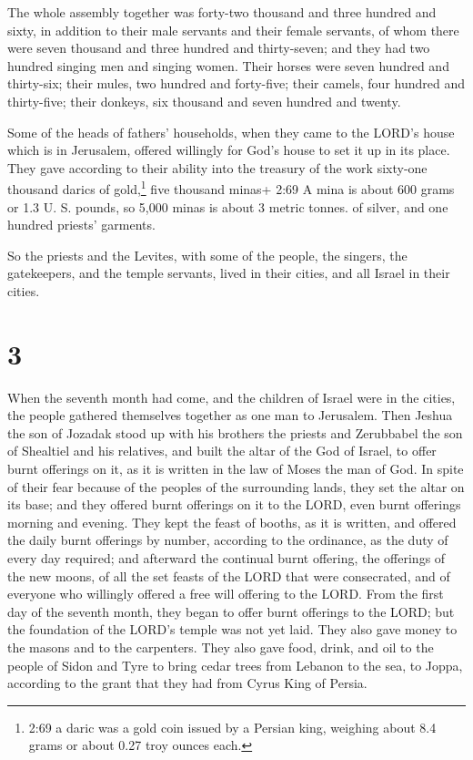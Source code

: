  The whole assembly together was forty-two thousand and
three hundred and sixty,  in addition to their male
servants and their female servants, of whom there were seven thousand
and three hundred and thirty-seven; and they had two hundred singing men
and singing women.  Their horses were seven hundred and
thirty-six; their mules, two hundred and forty-five;  their
camels, four hundred and thirty-five; their donkeys, six thousand and
seven hundred and twenty.

 Some of the heads of fathers' households, when they came
to the LORD's house which is in Jerusalem, offered willingly for God's
house to set it up in its place.  They gave according to
their ability into the treasury of the work sixty-one thousand darics of
gold,\footnote{2:69 a daric was a gold coin issued by a Persian king,
  weighing about 8.4 grams or about 0.27 troy ounces each.} five
thousand minas+ 2:69 A mina is about 600 grams or 1.3 U. S. pounds, so
5,000 minas is about 3 metric tonnes. of silver, and one hundred
priests' garments.

 So the priests and the Levites, with some of the people,
the singers, the gatekeepers, and the temple servants, lived in their
cities, and all Israel in their cities.

\hypertarget{section-2}{%
\section{3}\label{section-2}}

 When the seventh month had come, and the children of Israel
were in the cities, the people gathered themselves together as one man
to Jerusalem.  Then Jeshua the son of Jozadak stood up with
his brothers the priests and Zerubbabel the son of Shealtiel and his
relatives, and built the altar of the God of Israel, to offer burnt
offerings on it, as it is written in the law of Moses the man of God.
 In spite of their fear because of the peoples of the
surrounding lands, they set the altar on its base; and they offered
burnt offerings on it to the LORD, even burnt offerings morning and
evening.  They kept the feast of booths, as it is written,
and offered the daily burnt offerings by number, according to the
ordinance, as the duty of every day required;  and afterward
the continual burnt offering, the offerings of the new moons, of all the
set feasts of the LORD that were consecrated, and of everyone who
willingly offered a free will offering to the LORD.  From
the first day of the seventh month, they began to offer burnt offerings
to the LORD; but the foundation of the LORD's temple was not yet laid.
 They also gave money to the masons and to the carpenters.
They also gave food, drink, and oil to the people of Sidon and Tyre to
bring cedar trees from Lebanon to the sea, to Joppa, according to the
grant that they had from Cyrus King of Persia.

